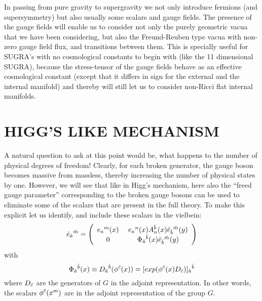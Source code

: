 \documentclass[a4paper,12pt]{article}
\begin{document}
In passing from pure gravity to supergravity we not only introduce fermions (and supersymmetry) but also usually some scalars and gauge fields. The presence of the gauge fields will enable us to consider not only the purely geometric vacua that we have been considering, but also the Freund-Reuben type vacua \cite{freund} with non-zero gauge field flux, and transitions between them. This is specially useful for SUGRA's with no cosmological constants to begin with (like the 11 dimensional SUGRA), because the stress-tensor of the gauge fields behave as an effective cosmological constant (except that it differs in sign for the external and the internal manifold) and thereby will still let us to consider non-Ricci flat internal manifolds.  
\setcounter{equation}{0}

\section{ {\bf  HIGG'S LIKE MECHANISM }}
A natural question to ask at this point would be, what happens to the number of physical degrees of freedom! Clearly, for each broken generator, the gauge boson becomes massive from massless, thereby  increasing the number  of physical states by one. However, we will see that like in Higg's mechanism, here also the ``freed gauge parameter'' corresponding to the broken gauge bosons can be used to eliminate some of the scalars that are present in the full theory. To make this explicit let us identify, and include these scalars in the vielbein:
\begin{equation}
\hat{e}_{\hat{a}}{}^{\hat{m}}=\left( \begin{array}{cc}
e_{a}{}^{m}(x) & \ e_a{}^n(x)A_n^{\breve{b}}(x)\breve{e}_{\breve{b}}{}^{\breve{m}}(y)\\
0 &\ \Phi_{\breve{a}}{}^{\breve{b}}(x)\breve{e}_{\breve{b}}{}^{\breve{m}}(y)
\end{array} \right)
\end{equation}
with
\begin{equation}
\Phi_{\breve{a}}{}^{\breve{b}}(x)\equiv D_{\breve{a}}{}^{\breve{b}}(\phi^{\breve{c}}(x))=[exp(\phi^{\breve{c}}(x)D_{\breve{c}})]_{\breve{a}}{}^{\breve{b}}
\end{equation}
where $D_{\breve{c}}$ are the generators of $G$ in the adjoint representation. In other words, the scalars $\phi^{\breve{c}}(x^m)$ are in the adjoint representation of the group $G$. 
\end{document}
